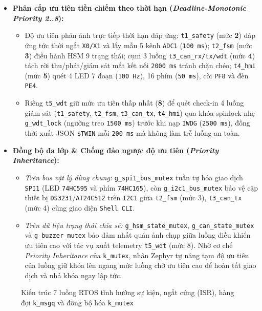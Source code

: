 \begin{itemize}[nosep]
\begin{itemize}[nosep]
    \end{itemize}
    \item \textbf{Phân cấp ưu tiên tiền chiếm theo thời hạn (\textit{Deadline-Monotonic Priority 2..8}):}
    \begin{itemize}[nosep]
        \item Độ ưu tiên phản ánh trực tiếp thời hạn đáp ứng: \texttt{t1\_safety} (mức \textbf{2}) đáp ứng tức thời ngắt \texttt{X0/X1} và lấy mẫu 5 kênh \texttt{ADC1} (\texttt{100~ms}); \texttt{t2\_fsm} (mức \textbf{3}) điều hành HSM 9 trạng thái; cụm 3 luồng \texttt{t3\_can\_rx/tx/wdt} (mức \textbf{4}) tách rời thu/phát/giám sát mất kết nối \texttt{2000~ms} tránh chặn chéo; \texttt{t4\_hmi} (mức \textbf{5}) quét 4 LED 7 đoạn (\texttt{100~Hz}), 16 phím (\texttt{50~ms}), còi \texttt{PF8} và đèn \texttt{PE4}.
        \item Riêng \texttt{t5\_wdt} giữ mức ưu tiên thấp nhất (\textbf{8}) để quét check-in 4 luồng giám sát (\texttt{t1\_safety}, \texttt{t2\_fsm}, \texttt{t3\_can\_tx}, \texttt{t4\_hmi}) qua khóa spinlock nhẹ \texttt{g\_wdt\_lock} (ngưỡng treo \texttt{1500~ms}) trước khi nạp \texttt{IWDG} (\texttt{2500~ms}), đồng thời xuất JSON \texttt{\$TWIN} mỗi \texttt{200~ms} mà không làm trễ luồng an toàn.
    \end{itemize}
    \item \textbf{Đồng bộ đa lớp \& Chống đảo ngược độ ưu tiên (\textit{Priority Inheritance}):}
    \begin{itemize}[nosep]
        \item \textit{Trên bus vật lý dùng chung:} \texttt{g\_spi1\_bus\_mutex} tuần tự hóa giao dịch \texttt{SPI1} (LED \texttt{74HC595} và phím \texttt{74HC165}), còn \texttt{g\_i2c1\_bus\_mutex} bảo vệ cặp thiết bị \texttt{DS3231}/\texttt{AT24C512} trên \texttt{I2C1} giữa \texttt{t2\_fsm} (mức 3), \texttt{t3\_can\_tx} (mức 4) cùng giao diện \texttt{Shell CLI}.
        \item \textit{Trên dữ liệu trạng thái chia sẻ:} \texttt{g\_hsm\_state\_mutex}, \texttt{g\_can\_state\_mutex} và \texttt{g\_buzzer\_mutex} bảo đảm nhất quán ảnh chụp giữa luồng điều khiển ưu tiên cao với tác vụ xuất telemetry \texttt{t5\_wdt} (mức 8). Nhờ cơ chế \textit{Priority Inheritance} của \texttt{k\_mutex}, nhân Zephyr tự nâng tạm độ ưu tiên của luồng giữ khóa lên ngang mức luồng chờ ưu tiên cao để hoàn tất giao dịch và nhả khóa ngay lập tức.
    \end{itemize}
\end{itemize}

\begin{figure}[H]
\centering

\caption{Kiến trúc 7 luồng RTOS tĩnh hướng sự kiện, ngắt cứng (ISR), hàng đợi \texttt{k\_msgq} và đồng bộ hóa \texttt{k\_mutex}}
\label{fig:rtos_arch}
\end{figure}

